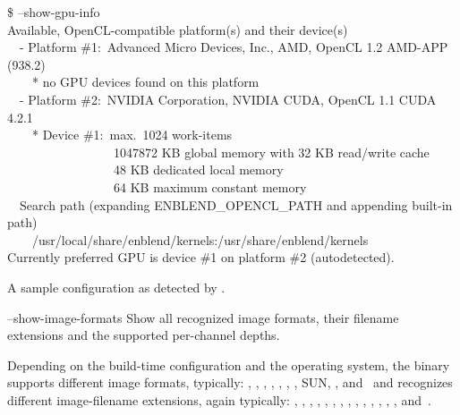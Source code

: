 \begin{codelist}
  \begin{exemplar}[htbp]
    \begin{maxipage}
      \centering
      \begin{terminal}
        \$ \app{} --show-gpu-info \\
        Available, OpenCL-compatible platform(s) and their device(s) \\
        ~~- Platform \#1:~Advanced Micro Devices, Inc., AMD, OpenCL 1.2 AMD-APP (938.2) \\
        ~~~~* no GPU devices found on this platform \\
        ~~- Platform \#2:~NVIDIA Corporation, NVIDIA CUDA, OpenCL 1.1 CUDA 4.2.1 \\
        ~~~~* Device \#1:~max.~1024 work-items \\
        ~~~~~~~~~~~~~~~~~1047872 KB global memory with 32 KB read/write cache \\
        ~~~~~~~~~~~~~~~~~48 KB dedicated local memory \\
        ~~~~~~~~~~~~~~~~~64 KB maximum constant memory \\
        ~~Search path (expanding ENBLEND\_OPENCL\_PATH and appending built-in path) \\
        ~~~~/usr/local/share/enblend/kernels:/usr/share/enblend/kernels \\
        Currently preferred GPU is device \#1 on platform \#2 (autodetected).
      \end{terminal}
    \end{maxipage}

    \caption[Sample  configuration.]{A sample
       configuration as detected by
      \App.\label{ex:opencl-config}}
  \end{exemplar}


  \label{opt:show-image-formats}%
\item[--show-image-formats]\itemend Show all recognized image
  formats,
  their filename extensions and the supported per-channel depths.

  Depending on the build-time configuration and the operating system,
  the binary supports different image formats, typically:
  , , , ,
  , , , SUN, ,
  and~ and recognizes different image-filename
  extensions, again typically: , ,
  , , , ,
  , , , ,
  , , , ,
  and~.


\end{codelist}
